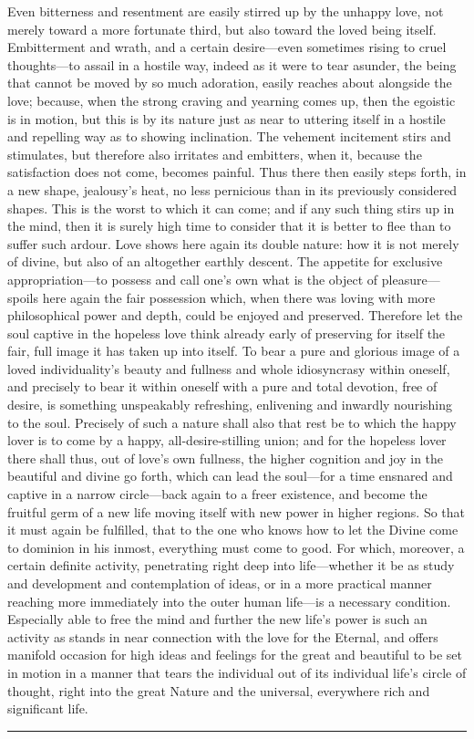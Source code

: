 \documentclass[12pt,a4paper]{book}
\begin{document}
Even bitterness and resentment are easily stirred up by the unhappy love,
not merely toward a more fortunate third, but also toward the loved being
itself. Embitterment and wrath, and a certain desire---even sometimes rising
to cruel thoughts---to assail in a hostile way, indeed as it were to tear
asunder, the being that cannot be moved by so much adoration, easily
reaches about alongside the love; because, when the strong craving and
yearning comes up, then the egoistic is in motion, but this is by its
nature just as near to uttering itself in a hostile and repelling way as to
showing inclination. The vehement incitement stirs and stimulates, but
therefore also irritates and embitters, when it, because the satisfaction
does not come, becomes painful. Thus there then easily steps forth, in a
new shape, jealousy's heat, no less pernicious than in its previously
considered shapes. This is the worst to which it can come; and if any such
thing stirs up in the mind, then it is surely high time to consider that it
is better to flee than to suffer such ardour. Love shows here again its
double nature: how it is not merely of divine, but also of an altogether
earthly descent. The appetite for exclusive appropriation---to possess and
call one's own what is the object of pleasure---spoils here again the fair
possession which, when there was loving with more philosophical power and
depth, could be enjoyed and preserved. Therefore let the soul captive in
the hopeless love think already early of preserving for itself the fair,
full image it has taken up into itself. To bear a pure and glorious image
of a loved individuality's beauty and fullness and whole idiosyncrasy
within oneself, and precisely to bear it within oneself with a pure and
total devotion, free of desire, is something unspeakably refreshing,
enlivening and inwardly nourishing to the soul. Precisely of such a nature
shall also that rest be to which the happy lover is to come by a happy,
all-desire-stilling union; and for the hopeless lover there shall thus, out
of love's own fullness, the higher cognition and joy in the beautiful and
divine go forth, which can lead the soul---for a time ensnared and captive
in a narrow circle---back again to a freer existence, and become the
fruitful germ of a new life moving itself with new power in higher regions.
So that it must again be fulfilled, that to the one who knows how to let the
Divine come to dominion in his inmost, everything must come to good. For
which, moreover, a certain definite activity, penetrating right deep into
life---whether it be as study and development and contemplation of ideas, or
in a more practical manner reaching more immediately into the outer human
life---is a necessary condition. Especially able to free the mind and
further the new life's power is such an activity as stands in near
connection with the love for the Eternal, and offers manifold occasion for
high ideas and feelings for the great and beautiful to be set in motion in
a manner that tears the individual out of its individual life's circle of
thought, right into the great Nature and the universal, everywhere rich and
significant life.
\begin{center}\rule{0.28\linewidth}{0.4pt}\end{center}
\end{document}
